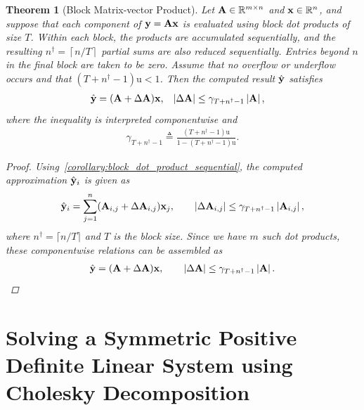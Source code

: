 \documentclass[11pt,draft]{article}
\newcommand{\urd}{\ensuremath{\mathrm{u}}}
\newcommand{\define}{\ensuremath{\triangleq}}
\newcommand{\vect}[1]{\mathbf{\MakeLowercase{#1}}}
\newcommand{\mat}[1]{\mathbf{\MakeUppercase{#1}}}
\newcommand{\ireal}[1]{\in\mathbb{R}^{#1}}
\newtheorem{theorem}{Theorem}[section]
\theoremstyle{definition}
\theoremstyle{remark}
\newcommand{\abs}[1]{\left|#1\right|}
\newcommand{\ceil}[1]{\left\lceil #1 \right\rceil}
\begin{document}
\begin{theorem}[Block Matrix-vector Product]
\label{theorem:block_matrix_vector_product}
Let $\mat{a}\ireal{m\times n}$ and $\vect{x}\ireal{n}$, and suppose that
each component of $\vect{y}=\mat{a}\vect{x}$ is evaluated using block dot
products of size $T$. Within each block, the products are accumulated
sequentially, and the resulting
$n^\dagger=\ceil{n/T}$ partial sums are also reduced sequentially. Entries
beyond $n$ in the final block are taken to be zero. Assume that no
overflow or underflow occurs and that
$(T+n^\dagger-1)\urd<1$. Then the computed result $\hat{\vect{y}}$
satisfies
\begin{align}
    \hat{\vect{y}}
    &=(\mat{a}+\Delta\mat{a})\vect{x},
    &
    \abs{\Delta\mat{a}}
    &\leq \gamma_{T+n^\dagger-1}\abs{\mat{a}},
\end{align}
where the inequality is interpreted componentwise and
\begin{align}
    \gamma_{T+n^\dagger-1}
    \define
    \frac{(T+n^\dagger-1)\urd}
         {1-(T+n^\dagger-1)\urd}.
\end{align}
    \begin{proof}
        Using~\cref{corollary:block_dot_product_sequential}, the computed approximation $\hat{\vect{y}}_i$ is given as
        \begin{align}
            \hat{\vect{y}}_i = \sum_{j=1}^n (\mat{a}_{i,j} + \Delta \mat{a}_{i,j})\vect{x}_j, \qquad \abs{\Delta \mat{a}_{i,j}} \leq \gamma_{T + n^\dagger - 1}\abs{\mat{a}_{i,j}},
        \end{align}
        where $n^\dagger = \lceil n / T \rceil$ and $T$ is the block size.
        Since we have $m$ such dot products, these componentwise relations
        can be assembled as
        \begin{align}
            \hat{\vect{y}} = (\mat{a} + \Delta \mat{a}) \vect{x},
            \qquad
            \abs{\Delta \mat{a}}
            \leq \gamma_{T + n^\dagger -1}\abs{\mat{a}}.
        \end{align}
    \end{proof}
\end{theorem}

\section{Solving a Symmetric Positive Definite Linear System using Cholesky Decomposition}
\end{document}
